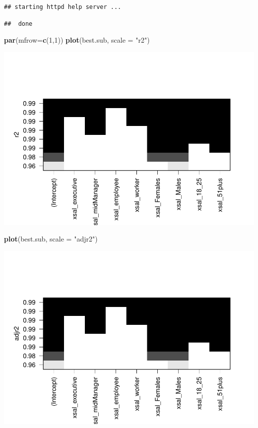 \documentclass[]{article}
\newenvironment{Shaded}{\begin{snugshade}}{\end{snugshade}}
\newcommand{\KeywordTok}[1]{\textcolor[rgb]{0.13,0.29,0.53}{\textbf{#1}}}
\newcommand{\DataTypeTok}[1]{\textcolor[rgb]{0.13,0.29,0.53}{#1}}
\newcommand{\DecValTok}[1]{\textcolor[rgb]{0.00,0.00,0.81}{#1}}
\newcommand{\StringTok}[1]{\textcolor[rgb]{0.31,0.60,0.02}{#1}}
\newcommand{\NormalTok}[1]{#1}
\begin{document}
\begin{verbatim}
## starting httpd help server ...
\end{verbatim}

\begin{verbatim}
##  done
\end{verbatim}

\begin{Shaded}
\begin{Highlighting}[]
\KeywordTok{par}\NormalTok{(}\DataTypeTok{mfrow=}\KeywordTok{c}\NormalTok{(}\DecValTok{1}\NormalTok{,}\DecValTok{1}\NormalTok{))}
\KeywordTok{plot}\NormalTok{(best.sub, }\DataTypeTok{scale =} \StringTok{"r2"}\NormalTok{)}
\end{Highlighting}
\end{Shaded}

\includegraphics{TSLproject_files/figure-latex/unnamed-chunk-17-6.pdf}

\begin{Shaded}
\begin{Highlighting}[]
\KeywordTok{plot}\NormalTok{(best.sub, }\DataTypeTok{scale =} \StringTok{"adjr2"}\NormalTok{)}
\end{Highlighting}
\end{Shaded}

\includegraphics{TSLproject_files/figure-latex/unnamed-chunk-17-7.pdf}
\end{document}
